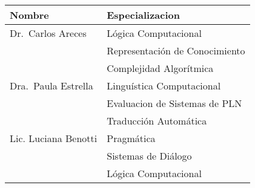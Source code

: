 
\begin{center}\small
    \begin{minipage}{\linewidth}
        \begin{center}
        \begin{tabular}{|l|l|}
        \hline\hline
        Nombre &  Especializacion \\
        \hline
        Dr.\ Carlos Areces &
          L\'ogica Computacional\\
        & Representaci\'on de Conocimiento\\
        & Complejidad Algor\'itmica
      \\ \hline
        Dra.\ Paula Estrella &
          Lingu\'istica Computacional \\
        & Evaluacion de Sistemas de PLN
      \\
		& Traducci\'on Autom\'atica \\ \hline
        Lic. Luciana Benotti &
          Pragm\'atica \\
        & Sistemas de Di\'alogo\\
        & L\'ogica Computacional\\
        \hline\hline
        \end{tabular}
        \end{center}
    \end{minipage}
\end{center}

